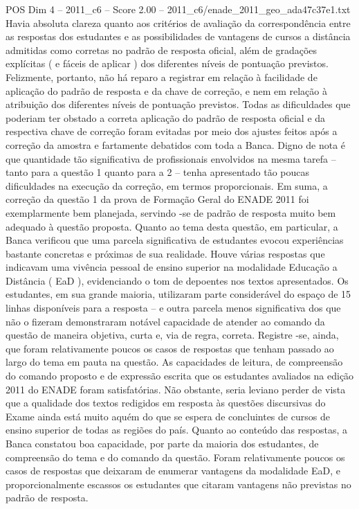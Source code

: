\begin{textsample}{POS Dim 4 – 2011\_c6 – Score 2.00 – 2011\_c6/enade\_2011\_geo\_ada47c37e1.txt}
Havia absoluta clareza quanto aos critérios de avaliação da correspondência entre as respostas dos estudantes e as possibilidades de vantagens de cursos a distância admitidas como corretas no padrão de resposta oficial, além de gradações explícitas ( e fáceis de aplicar ) dos diferentes níveis de pontuação previstos.
Felizmente, portanto, não há reparo a registrar em relação à facilidade de aplicação do padrão de resposta e da chave de correção, e nem em relação à atribuição dos diferentes níveis de pontuação previstos.
Todas as dificuldades que poderiam ter obstado a correta aplicação do padrão de resposta oficial e da respectiva chave de correção foram evitadas por meio dos ajustes feitos após a correção da amostra e fartamente debatidos com toda a Banca.
Digno de nota é que quantidade tão significativa de profissionais envolvidos na mesma tarefa – tanto para a questão 1 quanto para a 2 – tenha apresentado tão poucas dificuldades na execução da correção, em termos proporcionais.
Em suma, a correção da questão 1 da prova de Formação Geral do ENADE 2011 foi exemplarmente bem planejada, servindo -se de padrão de resposta muito bem adequado à questão proposta.
Quanto ao tema desta questão, em particular, a Banca verificou que uma parcela significativa de estudantes evocou experiências bastante concretas e próximas de sua realidade.
Houve várias respostas que indicavam uma vivência pessoal de ensino superior na modalidade Educação a Distância ( EaD ), evidenciando o tom de depoentes nos textos apresentados.
Os estudantes, em sua grande maioria, utilizaram parte considerável do espaço de 15 linhas disponíveis para a resposta – e outra parcela menos significativa dos que não o fizeram demonstraram notável capacidade de atender ao comando da questão de maneira objetiva, curta e, via de regra, correta.
Registre -se, ainda, que foram relativamente poucos os casos de respostas que tenham passado ao largo do tema em pauta na questão.
As capacidades de leitura, de compreensão do comando proposto e de expressão escrita que os estudantes avaliados na edição 2011 do ENADE foram satisfatórias.
Não obstante, seria leviano perder de vista que a qualidade dos textos redigidos em resposta às questões discursivas do Exame ainda está muito aquém do que se espera de concluintes de cursos de ensino superior de todas as regiões do país.
Quanto ao conteúdo das respostas, a Banca constatou boa capacidade, por parte da maioria dos estudantes, de compreensão do tema e do comando da questão.
Foram relativamente poucos os casos de respostas que deixaram de enumerar vantagens da modalidade EaD, e proporcionalmente escassos os estudantes que citaram vantagens não previstas no padrão de resposta.

\end{textsample}
